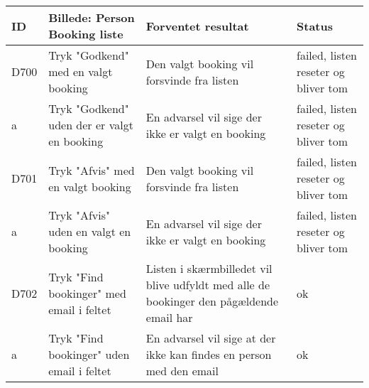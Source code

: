 \begin{tabularx}{\textwidth}{ |X|X|X|X| }
\hline
	ID & Billede: Person Booking liste   & Forventet resultat & Status\\ 
\hline
	D700 & Tryk "Godkend" med en valgt booking & Den valgt booking vil forsvinde fra listen & failed, listen reseter og bliver tom \\
\hline
	a & Tryk "Godkend" uden der er valgt en booking & En advarsel vil sige der ikke er valgt en booking & failed, listen reseter og bliver tom \\
\hline
	D701 & Tryk "Afvis" med en valgt booking & Den valgt booking vil forsvinde fra listen & failed, listen reseter og bliver tom \\
\hline
	a & Tryk "Afvis" uden en valgt en booking & En advarsel vil sige der ikke er valgt en booking & failed, listen reseter og bliver tom\\
\hline
	D702 & Tryk "Find bookinger" med email i feltet & Listen i skærmbilledet vil blive udfyldt med alle de bookinger den pågældende email har & ok \\
\hline 
	a & Tryk "Find bookinger" uden email i feltet & En advarsel vil sige at der ikke kan findes en person med den email & ok \\
\hline
\end{tabularx}

